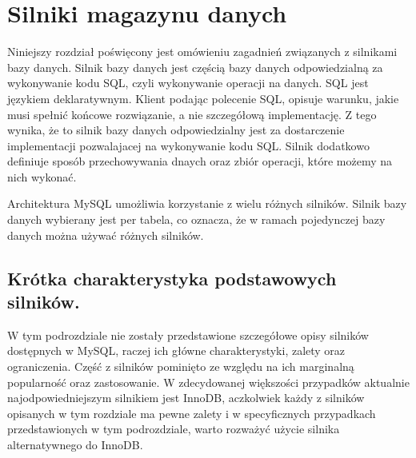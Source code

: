 \section{Silniki magazynu danych}
Niniejszy rozdział poświęcony jest omówieniu zagadnień związanych z silnikami bazy danych. Silnik bazy danych jest częścią bazy danych odpowiedzialną za wykonywanie kodu SQL, czyli wykonywanie operacji na danych. SQL jest językiem deklaratywnym. Klient podając polecenie SQL, opisuje warunku, jakie musi spełnić końcowe rozwiązanie, a nie szczegółową implementację. Z tego wynika, że to silnik bazy danych odpowiedzialny jest za dostarczenie implementacji pozwalajacej na wykonywanie kodu SQL. Silnik dodatkowo definiuje sposób przechowywania dnaych oraz zbiór operacji, które możemy na nich wykonać.

Architektura MySQL umożliwia korzystanie z wielu różnych silników. Silnik bazy danych wybierany jest per tabela, co oznacza, że w ramach pojedynczej bazy danych można używać różnych silników.
\subsection{Krótka charakterystyka podstawowych silników.}
W tym podrozdziale nie zostały przedstawione szczegółowe opisy silników dostępnych w MySQL, raczej ich główne charakterystyki, zalety oraz ograniczenia. Część z silników pominięto ze względu na ich marginalną popularność oraz zastosowanie. W zdecydowanej większości przypadków aktualnie najodpowiedniejszym silnikiem jest InnoDB, aczkolwiek każdy z silników opisanych w tym rozdziale ma pewne zalety i w specyficznych przypadkach przedstawionych w tym podrozdziale, warto rozważyć użycie silnika alternatywnego do InnoDB.
